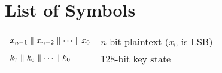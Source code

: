 \section*{List of Symbols}

\begin{tabular}{ll}
	$x_{n-1}\parallel x_{n-2}\parallel\cdots\parallel x_0$ & $n$-bit plaintext ($x_0$ is LSB)\\
	$k_7\parallel k_6\parallel\cdots\parallel k_0$ & 128-bit key state
\end{tabular}

\newpage